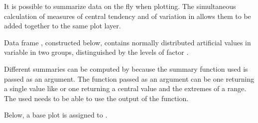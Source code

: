 \documentclass[krantz2]{krantz}\usepackage{knitr}
\begin{document}
It is possible to summarize data on the fly when plotting. The simultaneous calculation of measures of central tendency and of variation in  allows them to be added together to the same plot layer.

Data frame , constructed below, contains normally distributed artificial values in variable  in two groups, distinguished by the levels of factor .

\begin{knitrout}\footnotesize
{}\color{fgcolor}\begin{kframe}
\begin{alltt}
 \hlkwb{<-} \hlstd{(}
   \hlstd{=} \hlstd{(}\hlstd{(}\hlstd{,}  \hlstd{=} \hlstd{,}  \hlstd{=} \hlstd{),}
        \hlstd{(}\hlstd{,}  \hlstd{=} \hlstd{,}  \hlstd{=} \hlstd{)),}
   \hlstd{=} \hlstd{(}\hlstd{(}\hlstd{(}\hlstd{,} \hlstd{),} \hlstd{(}\hlstd{,} \hlstd{))))}
\end{alltt}
\end{kframe}
\end{knitrout}

Different summaries can be computed by  because the summary function used is passed as an argument. The function passed as an argument can be one returning a single value like  or one returning a central value and the extremes of a range. The  used needs to be able to use the output of the function.

Below, a base plot is assigned to .

\begin{knitrout}\footnotesize
{}\color{fgcolor}\begin{kframe}
\begin{alltt}
 \hlkwb{<-}
  \hlstd{(}   \hlstd{=} \hlstd{(}    \hlopt{+}
  \hlstd{(} \hlstd{=} \hlstd{)}
\end{alltt}
\end{kframe}
\end{knitrout}
\end{document}
